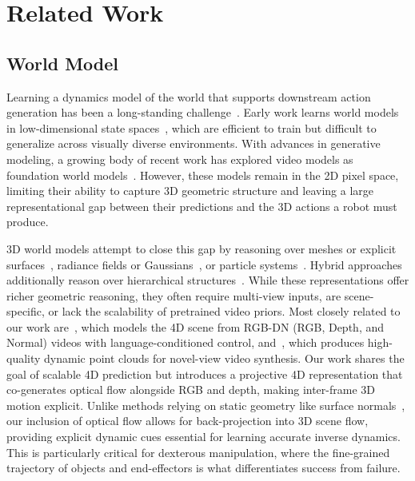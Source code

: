 \section{Related Work}
\subsection{World Model}
Learning a dynamics model of the world that supports downstream action generation has been a long-standing challenge~\citep{ha2018world,sutton1991dyna}. Early work learns world models in low-dimensional state spaces~\citep{achille2018separation,lesort2018state}, which are efficient to train but difficult to generalize across visually diverse environments. With advances in generative modeling, a growing body of recent work has explored video models as foundation world models~\citep{kong2024hunyuanvideo,wang2025wan,yang2024cogvideox}. However, these models remain in the 2D pixel space, limiting their ability to capture 3D geometric structure and leaving a large representational gap between their predictions and the 3D actions a robot must produce.

3D world models attempt to close this gap by reasoning over meshes or explicit surfaces~\citep{wang2021neus,pfaff2020learning,jiang2025phystwin,zhao2025physsplat,xia2025drawer,xia2024video2game,zhen2025learning,guo2026articulat3d}, radiance fields or Gaussians~\citep{mildenhall2021nerf,kerbl20233d,driess2023learning,xie2024physgaussian}, or particle systems~\citep{sanchez2020learning,abou2024particlenerf,zhang2025particle,chen20254dnex}. Hybrid approaches additionally reason over hierarchical structures~\citep{kaelbling2011hierarchical,wang2025enact,zhao2026high}. While these representations offer richer geometric reasoning, they often require multi-view inputs, are scene-specific, or lack the scalability of pretrained video priors. Most closely related to our work are~\citep{zhen2025learning}, which models the 4D scene from RGB-DN (RGB, Depth, and Normal) videos with language-conditioned control, and~\citep{chen20254dnex}, which produces high-quality dynamic point clouds for novel-view video synthesis. 
Our work shares the goal of scalable 4D prediction but introduces a projective 4D representation that co-generates optical flow alongside RGB and depth, making inter-frame 3D motion explicit. Unlike methods relying on static geometry like surface normals~\citep{zhen2025learning}, our inclusion of optical flow allows for back-projection into 3D scene flow, providing explicit dynamic cues essential for learning accurate inverse dynamics. This is particularly critical for dexterous manipulation, where the fine-grained trajectory of objects and end-effectors is what differentiates success from failure.



